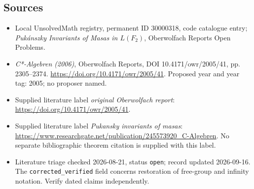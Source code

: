 \documentclass[11pt]{article}
\begin{document}
\subsection{Sources}
\begin{itemize}\item Local UnsolvedMath registry, permanent ID 30000318, code catalogue entry; \emph{Puk\'anszky Invariants of Masas in \(L(F_2)\)}, Oberwolfach Reports Open Problems.\item \emph{C*-Algebren (2006)}, Oberwolfach Reports, DOI 10.4171/owr/2005/41, pp. 2305--2374. \url{https://doi.org/10.4171/owr/2005/41}. Proposed year and year tag: 2005; no proposer named.\item Supplied literature label \emph{original Oberwolfach report}: \url{https://doi.org/10.4171/owr/2005/41}.\item Supplied literature label \emph{Pukansky invariants of masas}: \url{https://www.researchgate.net/publication/245573920_C-Algebren}. No separate bibliographic theorem citation is supplied with this label.\item Literature triage checked 2026-08-21, status \texttt{open}; record updated 2026-09-16. The \texttt{corrected\_verified} field concerns restoration of free-group and infinity notation. Verify dated claims independently.\end{itemize}
\end{document}
